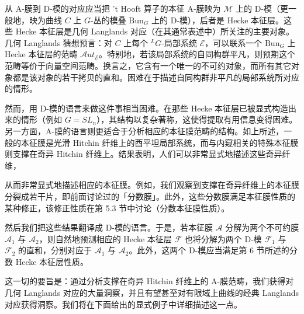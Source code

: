 \documentclass[11pt,a4paper]{article}
\newcommand{\Bun}{\mathrm{Bun}}
\begin{document}
从 A-膜到 D-模的对应应当把 't Hooft 算子的本征 A-膜映为 $\mathcal{M}$ 上的 D-模（更一般地，映为曲线 $C$ 上 $G$-丛的模叠 $\Bun_G$ 上的 D-模），后者是 Hecke 本征层。这些 Hecke 本征层是几何 Langlands 对应（在其通常表述中）所关注的主要对象。几何 Langlands 猜想预言：对 $C$ 上每个 ${}^{L}G$-局部系统 $\mathcal{E}$，可以联系一个 $\Bun_G$ 上 Hecke 本征层的范畴 $\mathcal{A}ut_\mathcal{E}$。特别地，若该局部系统的自同构群平凡，则预期这个范畴等价于向量空间范畴。换言之，它含有一个唯一的不可约对象，而所有其它对象都是该对象的若干拷贝的直和。困难在于描述自同构群非平凡的局部系统所对应的情形。

然而，用 D-模的语言来做这件事相当困难。在那些 Hecke 本征层已被显式构造出来的情形（例如 $G=SL_n$），其结构以复杂著称，这使得提取有用信息变得困难。另一方面，A-膜的语言则更适合于分析相应的本征膜范畴的结构。如上所述，一般的本征膜是光滑 Hitchin 纤维上的酉平坦局部系统，而与内窥相关的特殊本征膜则支撑在奇异 Hitchin 纤维上。结果表明，人们可以非常显式地描述这些奇异纤维，


从而非常显式地描述相应的本征膜。例如，我们观察到支撑在奇异纤维上的本征膜分裂成若干片，即前面讨论过的「分数膜」。此外，这些分数膜满足本征膜性质的某种修正，该修正性质在第 5.3 节中讨论（分数本征膜性质）。

然后我们把这些结果翻译成 D-模的语言。于是，若本征膜 $\mathcal{A}$ 分解为两个不可约膜 $\mathcal{A}_1$ 与 $\mathcal{A}_2$，则自然地预测相应的 Hecke 本征层 $\mathcal{F}$ 也将分解为两个 D-模 $\mathcal{F}_1$ 与 $\mathcal{F}_2$ 的直和，分别对应于 $\mathcal{A}_1$ 与 $\mathcal{A}_2$。此外，这两个 D-模应当满足第 6 节所述的分数 Hecke 本征层性质。

这一切的要旨是：通过分析支撑在奇异 Hitchin 纤维上的 A-膜范畴，我们获得对几何 Langlands 对应的大量洞察，并且有望甚至对有限域上曲线的经典 Langlands 对应获得洞察。我们将在下面给出的显式例子中详细描述这一点。

\end{document}
